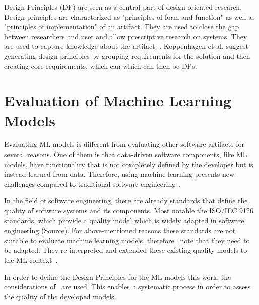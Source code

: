 
Design Principles (DP) are seen as a central part of design-oriented research.
\cite[p. 348]{gregor_positioningpresentingdesign_2013}
Design principles are characterized as "principles of form and function" as well as "principles
of implementation" of an artifact.
\cite[p.8]{gregor_anatomydesigntheory_}
They are used to close the gap between researchers and user and allow prescriptive research on
systems. They are used to capture knowledge about the artifact.
\cite[pp. 37-56]{sein_actiondesignresearch_2011}.
Koppenhagen et al. suggest generating design principles by grouping requirements for the solution
and then creating core requirements, which can
which can then be DPs.
\cite[p. 6]{koppenhagen_designscienceresearch_2012}


\section{Evaluation of Machine Learning Models}\label{sec:evaluation-of-machine-learning-models}
Evaluating \ac{ML} models is different from evaluating other software artifacts for several reasons.
One of them is that data-driven software components, like \ac{ML} models, have functionality that
is not
completely defined by the developer but is
instead learned from data.
Therefore, using machine learning presents new challenges compared to traditional software
engineering~\cite[p. 2]{siebert2022construction}.

In the field of software engineering, there are already standards that define the quality of
software systems and its components.
Most notable the ISO/IEC 9126 standards, which provide a quality model which is widely adapted in
software engineering (Source).
For above-mentioned reasons these standards are not suitable to evaluate machine learning models,
therefore~\cite{siebert2022construction} note that they need to be adapted.
They re-interpreted and extended these existing quality models to the ML context~\cite[p.
1]{siebert2022construction}.

In order to define the Design Principles for the \ac{ML} models this work, the
considerations of~\cite[]{siebert2022construction} are used.
This enables a systematic process in order to assess the quality of the developed models.

